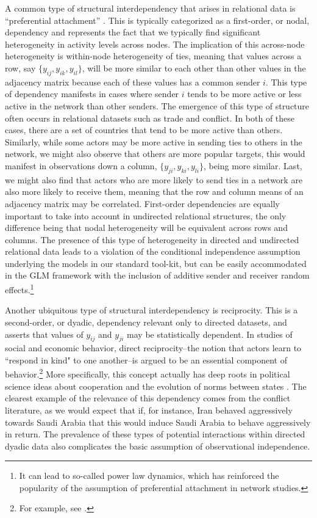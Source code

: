 \documentclass[12pt,onesided,pdflatex]{amsart}
\begin{document}
A common type of structural interdependency that arises in relational data is ``preferential attachment'' \citep{barabasi:reka:1999,reka:etal:1999}. This is typically categorized as a first-order, or nodal, dependency and represents the fact that we typically find significant heterogeneity in activity levels across nodes. The implication of this across-node heterogeneity is within-node heterogeneity of ties, meaning that values across a row, say $\{y_{ij},y_{ik},y_{il}\}$, will be more similar to each other than other values in the adjacency matrix because each of these values has a common sender $i$. This type of dependency manifests in cases where sender $i$ tends to be more active or less active in the network than other senders. The emergence of this type of structure often occurs in relational datasets such as trade and conflict. In both of these cases, there are a set of countries that tend to be more active than others. Similarly, while some actors may be more active in sending ties to others in the network, we might also observe that others are more popular targets, this would manifest in observations down a column, $\{y_{ji},y_{ki},y_{li}\}$, being more similar. Last, we might also find that actors who are more likely to send ties in a network are also more likely to receive them, meaning that the row and column means of an adjacency matrix may be correlated. First-order dependencies are equally important to take into account in undirected relational structures, the only difference being that nodal heterogeneity will be equivalent across rows and columns. The presence of this type of heterogeneity in directed and undirected relational data leads to a violation of the conditional independence assumption underlying the models in our standard tool-kit, but can be easily accommodated in the GLM framework with the inclusion of additive sender and receiver random effects.\footnote{It can lead to so-called power law dynamics, which has reinforced the popularity of the assumption of preferential attachment in network studies.}

Another ubiquitous type of structural interdependency is reciprocity. This is a second-order, or dyadic, dependency relevant only to directed datasets, and asserts that values of $y_{ij}$ and $y_{ji}$ may be statistically dependent. In studies of social and economic behavior, direct reciprocity--the notion that actors learn to ``respond in kind" to one another--is argued to be an essential component of behavior.\footnote{For example, see \cite{bolton:1998, cox:2007}.} More specifically, this concept actually has deep roots in political science ideas about cooperation and the evolution of norms between states \citep{richardson:1960,choucri:north:1972,keohane:1989,rajmaira:ward:1990,goldstein:freeman:1991,brandt:etal:2008}.  The clearest example of the relevance of this dependency comes from the conflict literature, as we would expect that if, for instance, Iran behaved aggressively towards Saudi Arabia that this would induce Saudi Arabia to behave aggressively in return. The prevalence of these types of potential interactions within directed dyadic data also complicates the basic assumption of observational independence.
\end{document}
